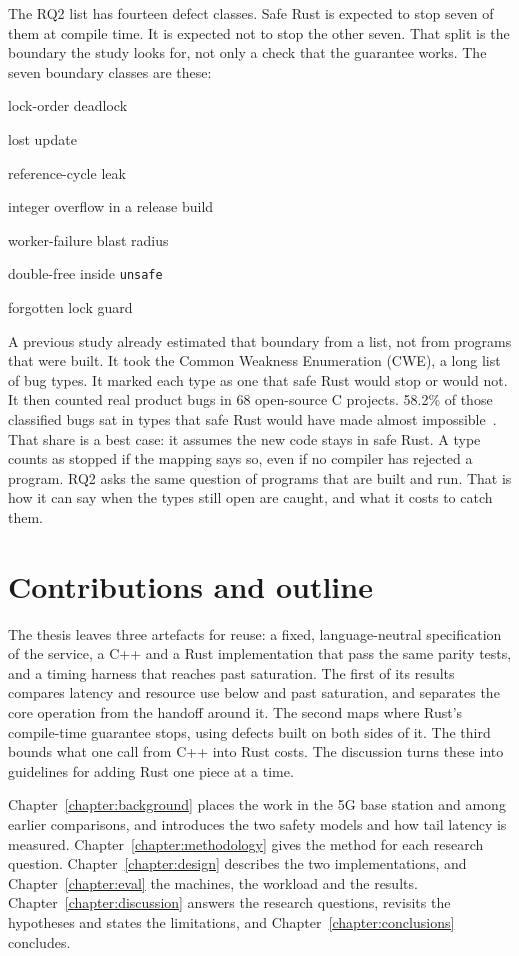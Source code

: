 \documentclass[english,oneside,a4paper,censored,csm,software-track-2020]{HYthesisML}
\begin{document}
The RQ2 list has fourteen defect classes. Safe Rust is expected to stop seven of
them at compile time. It is expected not to stop the other seven. That split is
the boundary the study looks for, not only a check that the guarantee works. The seven
boundary classes are these:
\begin{compactitem}
\item lock-order deadlock
\item lost update
\item reference-cycle leak
\item integer overflow in a release build
\item worker-failure blast radius
\item double-free inside \texttt{unsafe}
\item forgotten lock guard
\end{compactitem}

A previous study already estimated that boundary from a list, not from
programs that were built.
It took the Common Weakness Enumeration (CWE), a long list of bug
types.
It marked each type as one that safe Rust would stop or would not.
It then counted real product bugs in 68 open-source C projects.
58.2\% of those classified bugs sat in types that safe Rust would have
made almost impossible~\cite{meneely2025justuserust}.
That share is a best case: it assumes the new code stays in safe Rust.
A type counts as stopped if the mapping says so, even if no compiler
has rejected a program.
RQ2 asks the same question of programs that are built and run.
That is how it can say when the types still open are caught, and what
it costs to catch them.

\section{Contributions and outline}\label{sec:contrib}
The thesis leaves three artefacts for reuse: a fixed, language-neutral specification of the
service, a C++ and a Rust implementation that pass the same parity tests, and a timing
harness that reaches past saturation. The first of its results compares latency and resource
use below and past saturation, and separates the core operation from the handoff around it.
The second maps where Rust's compile-time guarantee stops, using defects built on both sides
of it. The third bounds what one call from C++ into Rust costs. The discussion turns these
into guidelines for adding Rust one piece at a time.

Chapter~\ref{chapter:background} places the work in the 5G base station and among earlier
comparisons, and introduces the two safety models and how tail latency is measured.
Chapter~\ref{chapter:methodology} gives the method for each research question.
Chapter~\ref{chapter:design} describes the two implementations, and Chapter~\ref{chapter:eval}
the machines, the workload and the results. Chapter~\ref{chapter:discussion} answers the
research questions, revisits the hypotheses and states the limitations, and
Chapter~\ref{chapter:conclusions} concludes.
\end{document}
